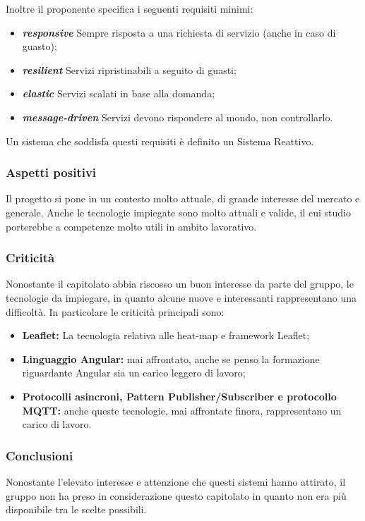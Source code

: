 \documentclass{article}
\begin{document}
Inoltre il proponente specifica i seguenti requisiti minimi:
\begin{itemize}
	\item \textbf{\textit{responsive}} Sempre risposta a una richiesta di servizio (anche in caso di guasto);
	\item \textbf{\textit{resilient}} Servizi ripristinabili a seguito di guasti;
	\item \textbf{\textit{elastic}} Servizi scalati in base alla domanda;
	\item \textbf{\textit{message-driven}} Servizi devono rispondere al mondo, non controllarlo.
\end{itemize}
Un sistema che soddisfa questi requisiti è definito un Sistema Reattivo.
	
	
\subsubsection{Aspetti positivi}

Il progetto si pone in un contesto molto attuale, di grande interesse del mercato e generale.
Anche le tecnologie impiegate sono molto attuali e valide, il cui studio porterebbe a competenze molto utili in ambito lavorativo.



\subsubsection{Criticità}

Nonostante il capitolato abbia riscosso un buon interesse da parte del gruppo, le tecnologie da impiegare, in quanto alcune nuove e interessanti rappresentano una difficoltà.
In particolare le criticità principali sono:
\begin{itemize}
    \item \textbf{Leaflet:} La tecnologia relativa alle heat-map e framework Leaflet;
    \item \textbf{Linguaggio Angular:} mai affrontato, anche se penso la formazione riguardante Angular sia un carico leggero di lavoro;
    \item \textbf{Protocolli asincroni, Pattern Publisher/Subscriber e protocollo MQTT: } anche queste tecnologie, mai affrontate finora, rappresentano un carico di lavoro.
\end{itemize}


\subsubsection{Conclusioni}

Nonostante l'elevato interesse e attenzione che questi sistemi hanno attirato, il gruppo non ha preso in considerazione questo capitolato in quanto non era più disponibile tra le scelte possibili.
\end{document}
